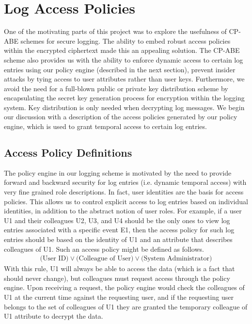 \documentclass{sig-alternate}
\begin{document}
\section{Log Access Policies}
One of the motivating parts of this project was to explore the usefulness of CP-ABE schemes
for secure logging. The ability to embed robust access policies within the encrypted
ciphertext made this an appealing solution. The CP-ABE scheme also provides us with the ability to
enforce dynamic access to certain log entries using our policy engine (described in the next section),
prevent insider attacks by tying access to user attributes rather than user keys. Furthermore,
we avoid the need for a full-blown public or private key distribution scheme by encapsulating the secret
key generation process for encryption within the logging system. Key distribution is only needed when
decrypting log messages. We begin our discussion with a description of the access policies generated
by our policy engine, which is used to grant temporal access to certain log entries.

\subsection{Access Policy Definitions}
The policy engine in our logging scheme is motivated by the need to provide forward and backward security
for log entries (i.e. dynamic temporal access) with very fine grained role descriptions. In 
fact, user identities are the basis for access policies. This allows us to control explicit access to log entries based on individual
identities, in addition to the abstract notion of user roles. For example, if a user 
U1 and their colleagues U2, U3, and U4 should be the only ones to view log entries associated with a specific event E1, then the access 
policy for such log entries should be based on the identity of U1 and an attribute that describes
colleagues of U1. Such an access policy might be defined as follows.
\begin{align*}
\text{(User ID)} \lor \text{(Colleague of User)} \lor \text{(System Administrator)}
\end{align*}
With this rule, U1 will always be able to access the data (which is a fact that should never change), but 
colleagues must request access through the policy engine. Upon receiving a request, the policy engine would
check the colleagues of U1 at the current time against the requesting user, and if the requesting user
belongs to the set of colleagues of U1 they are granted the temporary colleague of U1 attribute to decrypt the data. 
\end{document}
